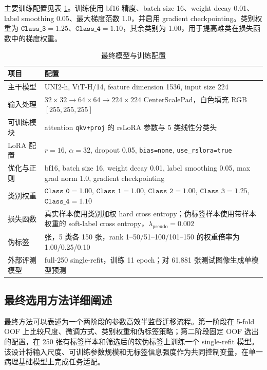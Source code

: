 \documentclass[a4paper,12pt]{article}
\newcommand{\cls}[1]{\texttt{Class\_#1}}
\begin{document}
主要训练配置见表 \ref{tab:final-config}。训练使用 bf16 精度、batch size 16、weight decay 0.01、label smoothing 0.05、最大梯度范数 1.0，并启用 gradient checkpointing。类别权重为 \(\cls{3}=1.25\)、\(\cls{4}=1.10\)，其余类别为 1.00，用于提高难类在损失函数中的梯度权重。

\begin{table}[H]
    \centering
    \caption[Final model configuration]{最终模型与训练配置}
    \label{tab:final-config}
    \small
        \begin{tabular}{l>{\raggedright\arraybackslash}p{9.5cm}}
        \toprule
        \textbf{项目} & \textbf{配置} \\
        \midrule
        主干模型 & UNI2-h, ViT-H/14, feature dimension 1536, input size 224 \\
        输入处理 & \(32\times32 \rightarrow 64\times64 \rightarrow 224\times224\) CenterScalePad，白色填充 RGB \([255,255,255]\) \\
        可训练模块 & attention \texttt{qkv+proj} 的 rsLoRA 参数与 5 类线性分类头 \\
        LoRA 配置 & \(r=16\), \(\alpha=32\), dropout 0.05, \texttt{bias=none}, \texttt{use\_rslora=true} \\
        优化与正则 & bf16, batch size 16, weight decay 0.01, label smoothing 0.05, max grad norm 1.0, gradient checkpointing \\
        类别权重 & \(\cls{0}=1.00\), \(\cls{1}=1.00\), \(\cls{2}=1.00\), \(\cls{3}=1.25\), \(\cls{4}=1.10\) \\
        损失函数 & 真实样本使用类别加权 hard cross entropy；伪标签样本使用带样本权重的 soft-label cross entropy，\(\lambda_{\mathrm{pseudo}}=0.002\) \\
        伪标签 & 750 张，5 类各 150 张，rank 1--50/51--100/101--150 的权重倍率为 1.00/0.25/0.10 \\
        外部评测模型 & full-250 single-refit，训练 11 epoch；对 61,881 张测试图像生成单模型预测 \\
        \bottomrule
    \end{tabular}
\end{table}

\subsection{最终选用方法详细阐述}

最终方法可以表述为一个两阶段的参数高效半监督迁移流程。第一阶段在 5-fold OOF 上比较尺度、微调方式、类别权重和伪标签策略；第二阶段固定 OOF 选出的配置，在 250 张有标签样本和筛选后的软伪标签上训练一个 single-refit 模型。该设计将输入尺度、可训练参数规模和无标签信息强度作为共同控制变量，在单一病理基础模型上完成任务适配。
\end{document}
